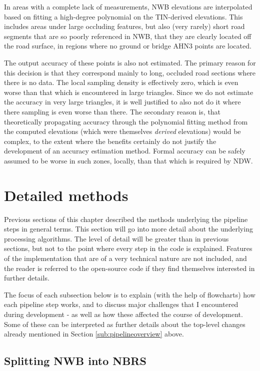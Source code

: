In areas with a complete lack of measurements, NWB elevations are interpolated based on fitting a high-degree polynomial on the TIN-derived elevations. This includes areas under large occluding features, but also (very rarely) short road segments that are so poorly referenced in NWB, that they are clearly located off the road surface, in regions where no ground or bridge AHN3 points are located.

The output accuracy of these points is also not estimated. The primary reason for this decision is that they correspond mainly to long, occluded road sections where there is no data. The local sampling density is effectively zero, which is even worse than that which is encountered in large triangles. Since we do not estimate the accuracy in very large triangles, it is well justified to also not do it where there sampling is even worse than there. The secondary reason is, that theoretically propagating accuracy through the polynomial fitting method from the computed elevations (which were themselves \textit{derived} elevations) would be complex, to the extent where the benefits certainly do not justify the development of an accuracy estimation method. Formal accuracy can be safely assumed to be worse in such zones, locally, than that which is required by NDW.

\section{Detailed methods}
\label{sec:methods}

Previous sections of this chapter described the methods underlying the pipeline steps in general terms. This section will go into more detail about the underlying processing algorithms. The level of detail will be greater than in previous sections, but not to the point where every step in the code is explained. Features of the implementation that are of a very technical nature are not included, and the reader is referred to the open-source code if they find themselves interested in further details.

The focus of each subsection below is to explain (with the help of flowcharts) how each pipeline step works, and to discuss major challenges that I encountered during development - as well as how these affected the course of development. Some of these can be interpreted as further details about the top-level changes already mentioned in Section \ref{sub:pipelineoverview} above.

\subsection{Splitting NWB into NBRS}
\label{sub:m_nbrsgeneration}

